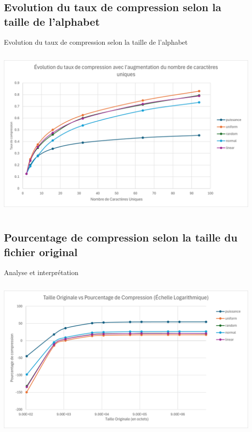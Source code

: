 \documentclass{beamer}
\begin{document}
\subsection*{Evolution du taux de compression selon la taille de l'alphabet}
\begin{frame}{Evolution du taux de compression selon la taille de l'alphabet}
    \begin{columns}[T]
        \begin{column}{0.9\textwidth}
            \includegraphics[width=\textwidth]{../assets/evolution-taux-de-compression-augmentation-unique-char.png}
        \end{column}
    \end{columns}
\end{frame}


\subsection*{Pourcentage de compression selon la taille du fichier original}
\begin{frame}{Analyse et interprétation}
    \begin{columns}[T]
        \begin{column}{0.9\textwidth}
            \includegraphics[width=\textwidth]{../assets/taille-original-vs-pourcentage-compression.png}
        \end{column}
    \end{columns}
\end{frame}
\end{document}
